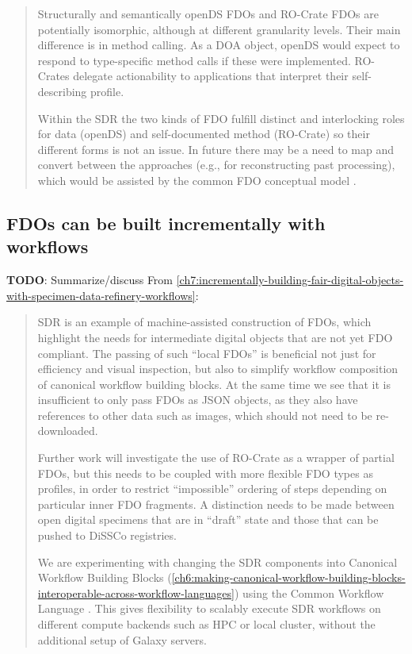 \begin{quotation}
  Structurally and semantically openDS FDOs and RO-Crate FDOs are
  potentially isomorphic, although at different granularity levels.
  Their
  main difference is in method calling.
  As a DOA object, openDS would
  expect to respond to type-specific method calls if these were
  implemented.
  RO-Crates delegate actionability to applications that
  interpret their self-describing profile.

  Within the SDR the two kinds of FDO fulfill distinct and interlocking
  roles for data (openDS) and self-documented method (RO-Crate) so their
  different forms is not an issue.
  In future there may be a need to map
  and convert between the approaches (e.g., for reconstructing past
  processing), which would be assisted by the common FDO conceptual model
  \cite{bonino2019}.

\end{quotation}


\subsection{FDOs can be built incrementally with workflows}
\textbf{TODO}: Summarize/discuss 
From \vref{ch7:incrementally-building-fair-digital-objects-with-specimen-data-refinery-workflows}:

\begin{quotation}
  SDR is an example of machine-assisted construction of FDOs, which
  highlight the needs for intermediate digital objects that are not yet
  FDO compliant.
  The passing of such ``local FDOs'' is beneficial not just
  for efficiency and visual inspection, but also to simplify workflow
  composition of canonical workflow building blocks.
  At the same time we
  see that it is insufficient to only pass FDOs as JSON objects, as they
  also have references to other data such as images, which should not need
  to be re-downloaded.

  Further work will investigate the use of RO-Crate as a wrapper of
  partial FDOs, but this needs to be coupled with more flexible FDO types
  as profiles, in order to restrict ``impossible'' ordering of steps
  depending on particular inner FDO fragments.
  A distinction needs to be
  made between open digital specimens that are in ``draft'' state and
  those that can be pushed to DiSSCo registries.

  We are experimenting with changing the SDR components into Canonical
  Workflow Building Blocks \cite{Soiland-Reyes 2022a}
  (\vref{ch6:making-canonical-workflow-building-blocks-interoperable-across-workflow-languages}) 
  using the Common Workflow Language \cite{Crusoe 2022}.
  This gives
  flexibility to scalably execute SDR workflows on different compute
  backends such as HPC or local cluster, without the additional setup of
  Galaxy servers.
\end{quotation}